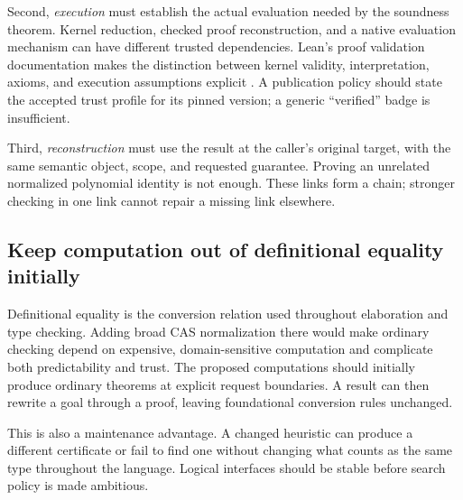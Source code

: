 \documentclass[11pt,letterpaper]{article}
\begin{document}
Second, \emph{execution} must establish the actual evaluation needed by the
soundness theorem. Kernel reduction, checked proof reconstruction, and a native
evaluation mechanism can have different trusted dependencies. Lean's proof
validation documentation makes the distinction between kernel validity,
interpretation, axioms, and execution assumptions explicit \cite{leanvalidation}.
A publication policy should state the accepted trust profile for its pinned
version; a generic ``verified'' badge is insufficient.

Third, \emph{reconstruction} must use the result at the caller's original
target, with the same semantic object, scope, and requested guarantee. Proving
an unrelated normalized polynomial identity is not enough. These links form a
chain; stronger checking in one link cannot repair a missing link elsewhere.

\begin{center}
\end{center}

\subsection{Keep computation out of definitional equality initially}
Definitional equality is the conversion relation used throughout elaboration
and type checking. Adding broad CAS normalization there would make ordinary
checking depend on expensive, domain-sensitive computation and complicate both
predictability and trust. The proposed computations should initially produce
ordinary theorems at explicit request boundaries. A result can then rewrite a
goal through a proof, leaving foundational conversion rules unchanged.

This is also a maintenance advantage. A changed heuristic can produce a
different certificate or fail to find one without changing what counts as the
same type throughout the language. Logical interfaces should be stable before
search policy is made ambitious.
\end{document}
